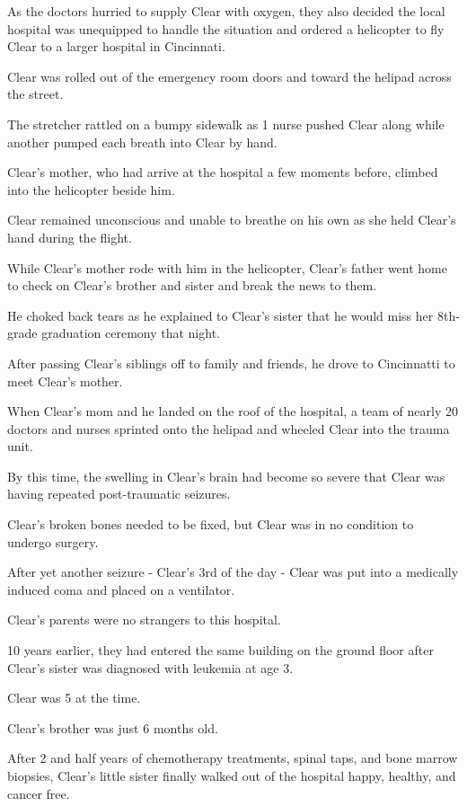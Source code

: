 \documentclass[oneside]{article}
\numberwithin{equation}{section}
\begin{document}
As the doctors hurried to supply Clear with oxygen, they also decided the local hospital was unequipped to handle the situation and ordered a helicopter to fly Clear to a larger hospital in Cincinnati.

%
Clear was rolled out of the emergency room doors and toward the helipad across the street.

The stretcher rattled on a bumpy sidewalk as 1 nurse pushed Clear along while another pumped each breath into Clear by hand.

Clear's mother, who had arrive at the hospital a few moments before, climbed into the helicopter beside him.

Clear remained unconscious and unable to breathe on his own as she held Clear's hand during the flight.

%
While Clear's mother rode with him in the helicopter, Clear's father went home to check on Clear's brother and sister and break the news to them.

He choked back tears as he explained to Clear's sister that he would miss her 8th-grade graduation ceremony that night.

After passing Clear's siblings off to family and friends, he drove to Cincinnatti to meet Clear's mother.

%
When Clear's mom and he landed on the roof of the hospital, a team of nearly 20 doctors and nurses sprinted onto the helipad and wheeled Clear into the trauma unit.

By this time, the swelling in Clear's brain had become so severe that Clear was having repeated post-traumatic seizures.

Clear's broken bones needed to be fixed, but Clear was in no condition to undergo surgery.

After yet another seizure - Clear's 3rd of the day - Clear was put into a medically induced coma and placed on a ventilator.

%
Clear's parents were no strangers to this hospital.

10 years earlier, they had entered the same building on the ground floor after Clear's sister was diagnosed with leukemia at age 3.

Clear was 5 at the time.

Clear's brother was just 6 months old.

After 2 and half years of chemotherapy treatments, spinal taps, and bone marrow biopsies, Clear's little sister finally walked out of the hospital happy, healthy, and cancer free.
\end{document}
